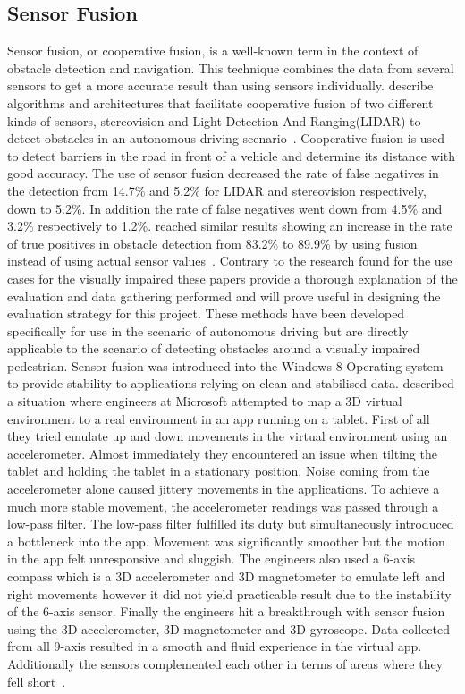 \documentclass[prodmode,acmtosem]{acmsmall} %
\begin{document}
\subsection{Sensor Fusion}
Sensor fusion, or cooperative fusion, is a well-known term in the context of obstacle detection and navigation. This technique combines the data from several sensors to get a more accurate result than using sensors individually. \citet{Labayrade2005} describe algorithms and architectures that facilitate cooperative fusion of two different kinds of sensors, stereovision and Light Detection And Ranging(LIDAR) to detect obstacles in an autonomous driving scenario~\cite{Labayrade2005}. Cooperative fusion is used to detect barriers in the road in front of a vehicle and determine its distance with good accuracy. The use of sensor fusion decreased the rate of false negatives in the detection from 14.7\% and 5.2\% for LIDAR and stereovision respectively, down to 5.2\%. In addition the rate of false negatives went down from 4.5\% and 3.2\% respectively to 1.2\%. \citet{Cho2014} reached similar results showing an increase in the rate of true positives in obstacle detection from 83.2\% to 89.9\% by using fusion instead of using actual sensor values~\cite{Cho2014}. Contrary to the research found for the use cases for the visually impaired these papers provide a thorough explanation of the evaluation and data gathering performed and will prove useful in designing the evaluation strategy for this project. These methods have been developed specifically for use in the scenario of autonomous driving but are directly applicable to the scenario of detecting obstacles around a visually impaired pedestrian. 
Sensor fusion was introduced into the Windows 8 Operating system to provide stability to applications relying on clean and stabilised data. \citet{Gear2012} described a situation where engineers at Microsoft attempted to map a 3D virtual environment to a real environment in an app running on a tablet. First of all they tried emulate up and down movements in the virtual environment using an accelerometer. Almost immediately they encountered an issue when tilting the tablet and holding the tablet in a stationary position. Noise coming from the accelerometer alone caused jittery movements in the applications. To achieve a much more stable movement, the accelerometer readings was passed through a low-pass filter. The low-pass filter fulfilled its duty but simultaneously introduced a bottleneck into the app. Movement was significantly smoother but the motion in the app felt unresponsive and sluggish. The engineers also used a 6-axis compass which is a 3D accelerometer and 3D magnetometer to emulate left and right movements however it did not yield practicable result due to the instability of the 6-axis sensor. Finally the engineers hit a breakthrough with sensor fusion using the 3D accelerometer, 3D magnetometer and 3D gyroscope. Data collected from all 9-axis resulted in a smooth and fluid experience in the virtual app. Additionally the sensors complemented each other in terms of areas where they fell short~\cite{Gear2012}.
\end{document}
